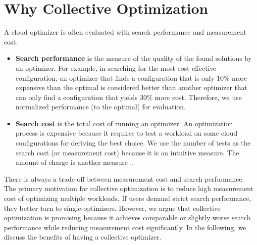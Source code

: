 \section{Why Collective Optimization}
\label{sec:motivation}

A cloud optimizer is often evaluated with search performance and measurement cost.

\begin{itemize}
\item \textbf{Search performance} is the measure of the quality of the found solutions by an optimizer.
For example, in searching for the most cost-effective configuration, an optimizer that finds a configuration that is only 10\% more expensive than the optimal is considered better than another optimizer
that can only find a configuration that yields 30\% more cost.
Therefore, we use normalized performance (to the optimal) for evaluation.

\item \textbf{Search cost}
is the total cost of running an optimizer.
An optimization process is expensive because it requires
to test a workload on some cloud configurations for deriving
the best choice.
We use the number of tests as the search cost (or measurement cost)
because it is an intuitive measure.
The amount of charge is another measure~\cite{Alipourfard2017}. 

\end{itemize}


There is always a trade-off between measurement cost and search performance.
The primary motivation for collective optimization is to reduce high measurement cost of optimizing multiple workloads.
If users demand strict search performance, they better turn to single-optimizers.
However, we argue that collective optimization is promising
because it achieves comparable or slightly worse search performance
while reducing measurement cost significantly.
In the following,
we discuss the benefits of having a collective optimizer.


